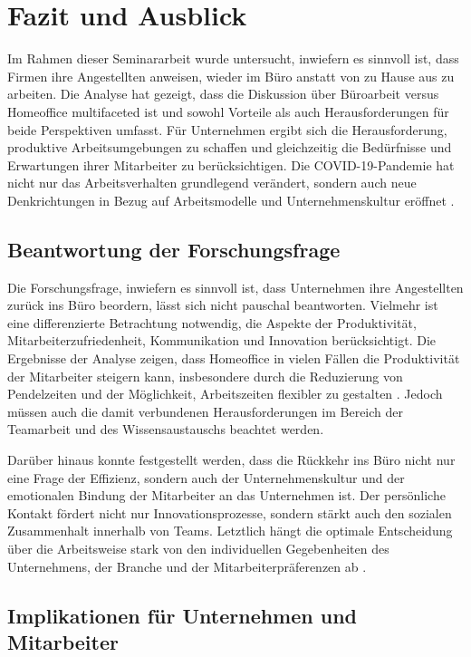 \section{Fazit und Ausblick}

Im Rahmen dieser Seminararbeit wurde untersucht, inwiefern es sinnvoll ist, dass Firmen ihre Angestellten anweisen, wieder im Büro anstatt von zu Hause aus zu arbeiten. Die Analyse hat gezeigt, dass die Diskussion über Büroarbeit versus Homeoffice multifaceted ist und sowohl Vorteile als auch Herausforderungen für beide Perspektiven umfasst. Für Unternehmen ergibt sich die Herausforderung, produktive Arbeitsumgebungen zu schaffen und gleichzeitig die Bedürfnisse und Erwartungen ihrer Mitarbeiter zu berücksichtigen. Die COVID-19-Pandemie hat nicht nur das Arbeitsverhalten grundlegend verändert, sondern auch neue Denkrichtungen in Bezug auf Arbeitsmodelle und Unternehmenskultur eröffnet \cite{file2}.

\subsection{Beantwortung der Forschungsfrage}

Die Forschungsfrage, inwiefern es sinnvoll ist, dass Unternehmen ihre Angestellten zurück ins Büro beordern, lässt sich nicht pauschal beantworten. Vielmehr ist eine differenzierte Betrachtung notwendig, die Aspekte der Produktivität, Mitarbeiterzufriedenheit, Kommunikation und Innovation berücksichtigt. Die Ergebnisse der Analyse zeigen, dass Homeoffice in vielen Fällen die Produktivität der Mitarbeiter steigern kann, insbesondere durch die Reduzierung von Pendelzeiten und der Möglichkeit, Arbeitszeiten flexibler zu gestalten \cite{file4}. Jedoch müssen auch die damit verbundenen Herausforderungen im Bereich der Teamarbeit und des Wissensaustauschs beachtet werden.

Darüber hinaus konnte festgestellt werden, dass die Rückkehr ins Büro nicht nur eine Frage der Effizienz, sondern auch der Unternehmenskultur und der emotionalen Bindung der Mitarbeiter an das Unternehmen ist. Der persönliche Kontakt fördert nicht nur Innovationsprozesse, sondern stärkt auch den sozialen Zusammenhalt innerhalb von Teams. Letztlich hängt die optimale Entscheidung über die Arbeitsweise stark von den individuellen Gegebenheiten des Unternehmens, der Branche und der Mitarbeiterpräferenzen ab \cite{file1}.

\subsection{Implikationen für Unternehmen und Mitarbeiter}

